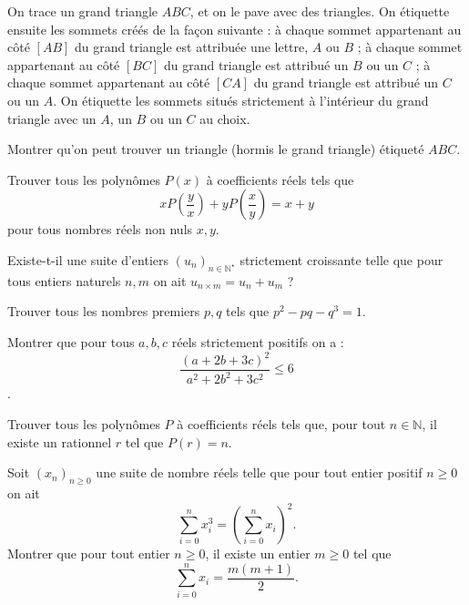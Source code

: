 \begin{exo}{}
On trace un grand triangle $ABC$, et on le pave avec des triangles. On 
étiquette ensuite les sommets créés de la façon suivante : à chaque 
sommet appartenant au côté $[AB]$ du grand triangle est attribuée
une lettre, $A$ ou $B$ ; à chaque sommet appartenant au côté $[BC]$ 
du grand triangle est attribué un $B$ ou un $C$ ; à chaque sommet 
appartenant au côté $[CA]$ du grand triangle est attribué un $C$ ou un $A$.
On étiquette les sommets situés strictement à l'intérieur du grand triangle
avec un $A$, un $B$ ou un $C$ au choix.

Montrer qu'on peut trouver un triangle (hormis le grand triangle) étiqueté $ABC$.
 \end{exo}


\begin{exo}{}
Trouver tous les polynômes $P(x)$ à coefficients réels tels que 
$$x P \left( \frac{y}{x} \right)+y P \left( \frac{x}{y} \right)=x+y$$
pour tous nombres réels non nuls $x,y$.
\end{exo}

\begin{exo}{}
Existe-t-il une suite d'entiers $(u_n)_{n \in \mathbb{N}^{\star}}$ strictement croissante telle que pour tous entiers naturels $n, m$ on ait $u_{n \times m} = u_n + u_m$ ?
\end{exo}


\begin{exo}{}
Trouver tous les nombres premiers $p,q$ tels que $ p^2-pq-q^3=1 $.
\end{exo}

\begin{exo}{}
Montrer que pour tous $a, b, c$ réels strictement positifs on a : \[ \frac{(a+2b+3c)^2}{a^2+2b^2+3c^2} \leq 6
\].
\end{exo}

\begin{exo}{}
Trouver tous les polynômes $P$ à coefficients réels tels que, pour tout $n \in \mathbb{N}$, il existe un rationnel $r$ tel que $P(r)=n$.
\end{exo}

\begin{exo}{}Soit $(x_{n})_{n \geq 0}$ une suite de nombre réels telle que pour tout entier positif $n \geq 0$ on ait
$$ \sum_{i=0}^{n}x_{i}^{3}= \left( \sum_{i=0}^{n}x_{i} \right) ^{2}.$$
Montrer que pour tout entier $n \geq 0$, il existe un entier $m \geq 0$ tel que
$$ \sum_{i=0}^{n}x_{i}= \frac{m(m+1)}{2}.$$
\end{exo}

